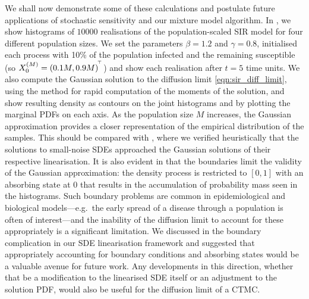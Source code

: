 We shall now demonstrate some of these calculations and postulate future applications of stochastic sensitivity and our mixture model algorithm.
In , we show histograms of \(10000\) realisations of the population-scaled SIR model for four different population sizes.
We set the parameters \(\beta = 1.2\) and \(\gamma = 0.8\), initialised each process with 10\% of the population infected and the remaining susceptible (so \(X_0^{(M)} = \left(0.1M, 0.9M\right)^{^{\!\top}}\)) and show each realisation after \(t = 5\) time units.
We also compute the Gaussian solution to the diffusion limit \cref{eqn:sir_diff_limit}, using the \citet{Mazzoni_2008_ComputationalAspectsContinuous} method for rapid computation of the moments of the solution, and show resulting density as contours on the joint histograms and by plotting the marginal PDFs on each axis.
As the population size \(M\) increases, the Gaussian approximation provides a closer representation of the empirical distribution of the samples.
This should be compared with , where we verified heuristically that the solutions to small-noise SDEs approached the Gaussian solutions of their respective linearisation.
It is also evident in  that the boundaries limit the validity of the Gaussian approximation: the density process is restricted to \([0, 1]\) with an absorbing state at \(0\) that results in the accumulation of probability mass seen in the histograms.
Such boundary problems are common in epidemiological and biological models---e.g.\ the early spread of a disease through a population is often of interest---and the inability of the diffusion limit to account for these appropriately is a significant limitation.
We discussed in  the boundary complication in our SDE linearisation framework and suggested that appropriately accounting for boundary conditions and absorbing states would be a valuable avenue for future work.
Any developments in this direction, whether that be a modification to the linearised SDE itself or an adjustment to the solution PDF, would also be useful for the diffusion limit of a CTMC.


